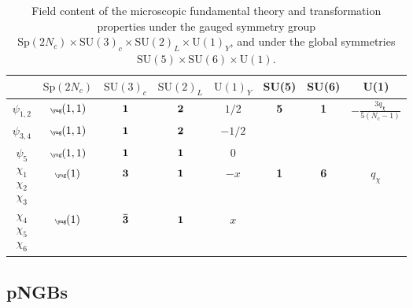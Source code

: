 \documentclass[preprintnumbers,nofootinbib,showpacs,eqsecnum,pre,12pt]{revtex4-1}
\newcommand{\SU}{\text{SU}}
\newcommand{\U}{\text{U}}
\newcommand{\Sp}{\text{Sp}}
\begin{document}
\begin{table}[htb]
	\begin{center}
		\begin{tabular}{|c|c|c|c|c||c|c|c|}
			\hline
			& $\Sp(2N_c)$&${\SU(3)}_c$&${\SU(2)}_L$&${\U(1)}_Y$ & SU(5) & SU(6) & U(1) \\
			\hline
			$\psi_{1,2}$&${\tiny{\yng(1,1)}}$&$\bf 1$&$\bf 2$&$1/2$& \multirow{3}{*}{\bf 5} & \multirow{3}{*}{\bf 1} & \multirow{3}{*}{$-\frac{3 q_\chi}{5 (N_c-1)}$}\\
			\cline{1-5}
			$\psi_{3,4}$&${\tiny{\yng(1,1)}}$&$\bf 1$&$\bf 2$&$-1/2$ & & &\\
			\cline{1-5}
		    $\psi_{5}$&${\tiny{\yng(1,1)}}$&$\bf 1$&$\bf 1$&$0$ & & & \\
			\hline
			$ \begin{array}{c} \chi_1 \\ \chi_2 \\ \chi_3\end{array} $&${\tiny{\yng(1)}}$&$\bf 3$&$\bf 1$&$-x$ & \multirow{4}{*}{\bf 1} & \multirow{4}{*}{\bf 6} & \multirow{4}{*}{$q_\chi$}\\
			\cline{1-5}
			$ \begin{array}{c} \chi_4 \\ \chi_5 \\ \chi_6\end{array} $&${\tiny{\yng(1)}}$&$\bf \bar{3}$&$\bf 1$&$x$ & & &\\
			\hline
		\end{tabular} 
	\end{center}
		\caption{Field content of the microscopic fundamental theory and transformation properties under the gauged symmetry group $\Sp(2N_c)\times\SU(3)_c \times \SU(2)_L \times  \U(1)_Y$, and under the global symmetries $\SU(5)\times\SU(6)\times\U(1)$.}
		\label{tab:micro}
	
\end{table}


\subsection{pNGBs}
\end{document}
